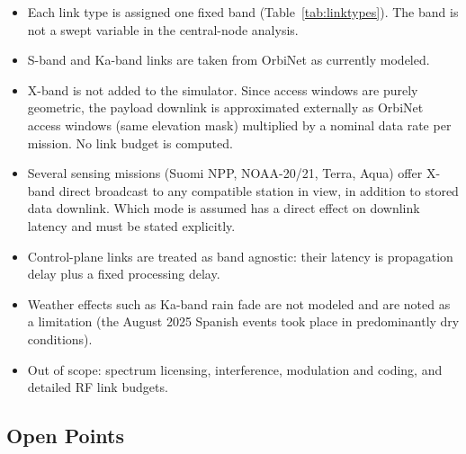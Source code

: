 \documentclass[11pt]{article}
\begin{document}
\begin{itemize}
    \item Each link type is assigned one fixed band (Table~\ref{tab:linktypes}). The band is not a swept variable in the central-node analysis.
    \item S-band and Ka-band links are taken from OrbiNet as currently modeled.
    \item X-band is not added to the simulator. Since access windows are purely geometric, the payload downlink is approximated externally as OrbiNet access windows (same elevation mask) multiplied by a nominal data rate per mission. No link budget is computed.
    \item Several sensing missions (Suomi NPP, NOAA-20/21, Terra, Aqua) offer X-band direct broadcast to any compatible station in view, in addition to stored data downlink. Which mode is assumed has a direct effect on downlink latency and must be stated explicitly.
    \item Control-plane links are treated as band agnostic: their latency is propagation delay plus a fixed processing delay.
    \item Weather effects such as Ka-band rain fade are not modeled and are noted as a limitation (the August 2025 Spanish events took place in predominantly dry conditions).
    \item Out of scope: spectrum licensing, interference, modulation and coding, and detailed RF link budgets.
\end{itemize}

\subsection{Open Points}
\label{subsec:bandopen}
\end{document}
